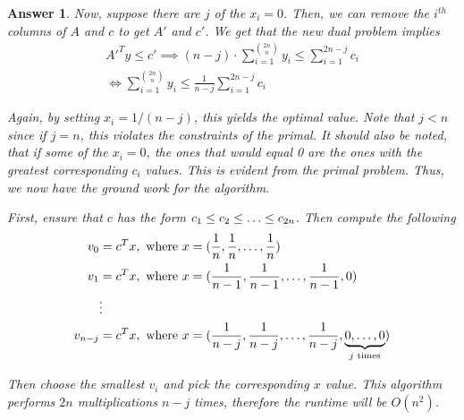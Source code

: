 \documentclass[12pt]{article}
\theoremstyle{colon}
\newtheorem*{answer}{Answer}
\begin{document}
\begin{answer}
  Now, suppose there are $j$ of the $x_i = 0$. Then, we can remove the $i^{th}$ columns of $A$ and $c$ to get $A'$ and $c'$. We get that the new dual problem implies
  \begin{gather*}
    A'^T y \leq c' \implies (n-j) \cdot \sum_{i = 1}^{\binom{2n}{n}} y_i \leq \sum_{i = 1}^{2n-j} c_i \\
    \Longleftrightarrow \sum_{i = 1}^{\binom{2n}{n}} y_i \leq \frac{1}{n-j} \sum_{i = 1}^{2n-j} c_i
  \end{gather*}

  Again, by setting $x_i = 1/(n-j)$, this yields the optimal value. Note that $j < n$ since if $j = n$, this violates the constraints of the primal. It should also be noted, that if some of the $x_i = 0$, the ones that would equal 0 are the ones with the greatest corresponding $c_i$ values. This is evident from the primal problem. Thus, we now have the ground work for the algorithm.

  First, ensure that $c$ has the form $c_1 \leq c_2 \leq \mathellipsis \leq c_{2n}$. Then compute the following
  \begin{align*}
    v_0 &= c^T x, \text{ where } x = (\frac{1}{n},\frac{1}{n},\mathellipsis,\frac{1}{n}) \\
    v_1 &= c^T x, \text{ where } x = (\frac{1}{n-1},\frac{1}{n-1},\mathellipsis,\frac{1}{n-1},0) \\
    &\vdots \\
    v_{n-j} &= c^T x, \text{ where } x = (\frac{1}{n-j},\frac{1}{n-j},\mathellipsis,\frac{1}{n-j},\underbrace{0,\mathellipsis,0}_{j \text{ times}})
  \end{align*}

  Then choose the smallest $v_i$ and pick the corresponding $x$ value. This algorithm performs $2n$ multiplications $n-j$ times, therefore the runtime will be $O(n^2)$.
\end{answer}

\clearpage
\end{document}
